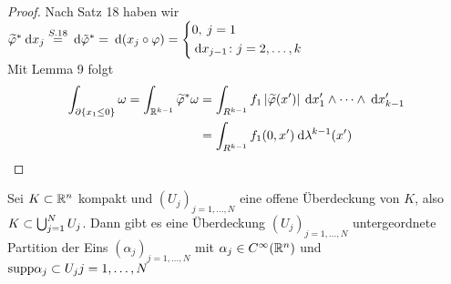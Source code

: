 \documentclass[skript.tex]{subfiles}
\begin{document}
\begin{lem}
\begin{proof}
					Nach Satz 18 haben wir $\wt{\varphi}^* \md x_j \overset{S.18}{=} \md \tilde{\varphi}^* = \md (x_j \circ \varphi) = \begin{cases*}
					0, \: j=1 \\ \md x_{j-1} \colon j= 2, \dots, k
					\end{cases*} $ \\
					
					Mit Lemma 9 folgt
					\begin{align*}
					\int_{\partial \{x_1 \leq 0 \}} \omega = \int_{\mathbb{R}^{k-1}} \widetilde{\varphi}^* \omega &=\int_ {R^{k-1}} f_1 \left| \widetilde{\varphi}(x') \right| \: \mathrm{d} x'_1 \wedge \dots \wedge \: \mathrm{d} x' _{k-1} \\ 
					&= \int _{R^{k-1}} f_1 (0,x') \: \mathrm{d} \lambda^{k-1}(x')
					\end{align*}
				\end{proof}
			\end{lem}
	
		\begin{theorem}
			Sei $K \subset {\mathbb{R}^n}$ kompakt und $(U_j)_{j=1, \dots, N}$ eine offene Überdeckung von $K$, also $K \subset \bigcup_{j =1}^{N} U_j$. Dann gibt es eine Überdeckung $(U_j)_{j = 1, \dots, N}$ untergeordnete Partition der Eins $(\alpha_j)_{j = 1, \dots, N}$ mit $\alpha_j \in C^{\infty} ({\mathbb{R}^n})$ und $\text{supp} \alpha_j \subset U_j j = 1, \dots, N$
		\end{theorem}
	
\end{document}
